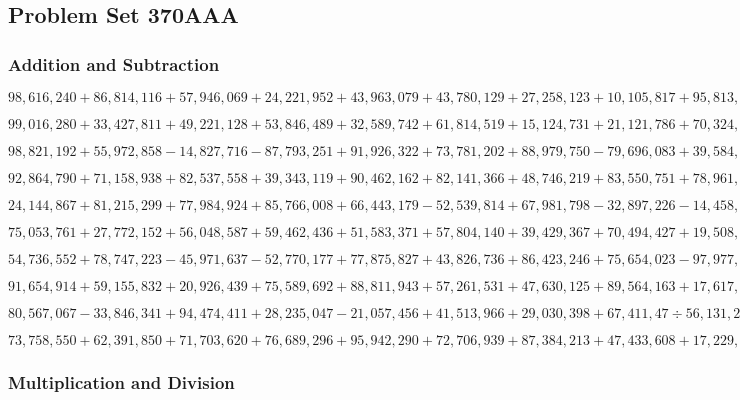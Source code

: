 \hypertarget{problem-set-370aaa}{%
\subsection{Problem Set 370AAA}\label{problem-set-370aaa}}

\hypertarget{addition-and-subtraction}{%
\subsubsection{Addition and
Subtraction}\label{addition-and-subtraction}}

\(98,616,240+86,814,116+57,946,069+24,221,952+43,963,079+43,780,129+27,258,123+10,105,817+95,813,468+18,982,850\)

\(99,016,280+33,427,811+49,221,128+53,846,489+32,589,742+61,814,519+15,124,731+21,121,786+70,324,450+29,667,828\)

\(98,821,192+55,972,858-14,827,716-87,793,251+91,926,322+73,781,202+88,979,750-79,696,083+39,584,737-87,505,134\)

\(92,864,790+71,158,938+82,537,558+39,343,119+90,462,162+82,141,366+48,746,219+83,550,751+78,961,321+63,888,770\)

\(24,144,867+81,215,299+77,984,924+85,766,008+66,443,179-52,539,814+67,981,798-32,897,226-14,458,039-13,434,890\)

\(75,053,761+27,772,152+56,048,587+59,462,436+51,583,371+57,804,140+39,429,367+70,494,427+19,508,894+86,808,754\)

\(54,736,552+78,747,223-45,971,637-52,770,177+77,875,827+43,826,736+86,423,246+75,654,023-97,977,50÷40,527,336\)

\(91,654,914+59,155,832+20,926,439+75,589,692+88,811,943+57,261,531+47,630,125+89,564,163+17,617,845+34,504,377\)

\(80,567,067-33,846,341+94,474,411+28,235,047-21,057,456+41,513,966+29,030,398+67,411,47÷56,131,245-69,180,389\)

\(73,758,550+62,391,850+71,703,620+76,689,296+95,942,290+72,706,939+87,384,213+47,433,608+17,229,701+79,329,256\)

\hypertarget{multiplication-and-division}{%
\subsubsection{Multiplication and
Division}\label{multiplication-and-division}}

